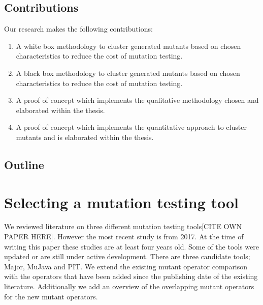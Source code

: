 \documentclass[conference]{IEEEtran}
\begin{document}
\subsection{Contributions}
Our research makes the following contributions:
\begin{enumerate}
 \item A white box methodology to cluster generated mutants based on chosen characteristics to reduce the cost of mutation testing.
  \item A black box methodology to cluster generated mutants based on chosen characteristics to reduce the cost of mutation testing.
 \item A proof of concept which implements the qualitative methodology chosen and elaborated within the thesis.
 \item A proof of concept which implements the quantitative approach to cluster mutants and is elaborated within the thesis. 
\end{enumerate}
\subsection{Outline}


\section{Selecting a mutation testing tool}
We reviewed literature on three different mutation testing tools[CITE OWN PAPER HERE].
However the most recent study is from 2017.
At the time of writing this paper these studies are at least four years old. 
Some of the tools were updated or are still under active development\cite{pit-releases,Major}.
There are three candidate tools; Major, MuJava and PIT.
We extend the existing mutant operator comparison with the operators that have been added since the publishing date of the existing literature.
Additionally we add an overview of the overlapping mutant operators for the new mutant operators.


\end{document}
